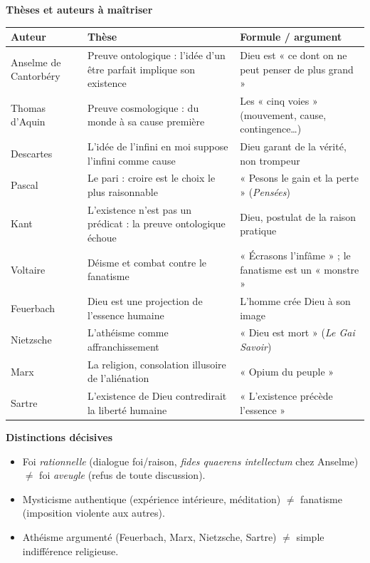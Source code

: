 \documentclass[11pt]{article}
\begin{document}
\begin{bilan}
\textbf{Thèses et auteurs à maîtriser}
\begin{center}
\begin{tabularx}{\linewidth}{|l|X|X|}
\hline
\rowcolor{popblueL} \textbf{Auteur} & \textbf{Thèse} & \textbf{Formule / argument} \\
\hline
Anselme de Cantorbéry & Preuve ontologique : l'idée d'un être parfait implique son existence & Dieu est « ce dont on ne peut penser de plus grand » \\
\hline
Thomas d'Aquin & Preuve cosmologique : du monde à sa cause première & Les « cinq voies » (mouvement, cause, contingence\ldots) \\
\hline
Descartes & L'idée de l'infini en moi suppose l'infini comme cause & Dieu garant de la vérité, non trompeur \\
\hline
Pascal & Le pari : croire est le choix le plus raisonnable & « Pesons le gain et la perte » (\emph{Pensées}) \\
\hline
Kant & L'existence n'est pas un prédicat : la preuve ontologique échoue & Dieu, postulat de la raison pratique \\
\hline
Voltaire & Déisme et combat contre le fanatisme & « Écrasons l'infâme » ; le fanatisme est un « monstre » \\
\hline
Feuerbach & Dieu est une projection de l'essence humaine & L'homme crée Dieu à son image \\
\hline
Nietzsche & L'athéisme comme affranchissement & « Dieu est mort » (\emph{Le Gai Savoir}) \\
\hline
Marx & La religion, consolation illusoire de l'aliénation & « Opium du peuple » \\
\hline
Sartre & L'existence de Dieu contredirait la liberté humaine & « L'existence précède l'essence » \\
\hline
\end{tabularx}
\end{center}

\textbf{Distinctions décisives}
\begin{itemize}
  \item Foi \emph{rationnelle} (dialogue foi/raison, \emph{fides quaerens intellectum} chez Anselme) $\neq$ foi \emph{aveugle} (refus de toute discussion).
  \item Mysticisme authentique (expérience intérieure, méditation) $\neq$ fanatisme (imposition violente aux autres).
  \item Athéisme argumenté (Feuerbach, Marx, Nietzsche, Sartre) $\neq$ simple indifférence religieuse.
\end{itemize}


\end{bilan}
\end{document}
